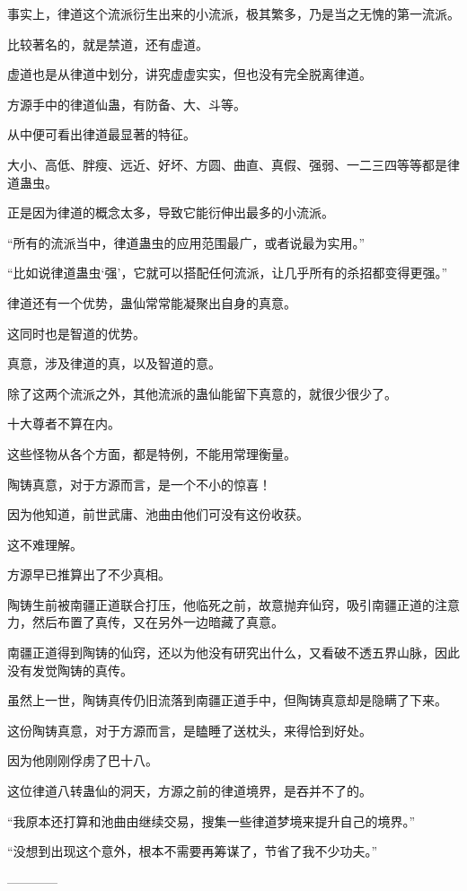 \begin{this_body}
事实上，律道这个流派衍生出来的小流派，极其繁多，乃是当之无愧的第一流派。

比较著名的，就是禁道，还有虚道。

虚道也是从律道中划分，讲究虚虚实实，但也没有完全脱离律道。

方源手中的律道仙蛊，有防备、大、斗等。

从中便可看出律道最显著的特征。

大小、高低、胖瘦、远近、好坏、方圆、曲直、真假、强弱、一二三四等等都是律道蛊虫。

正是因为律道的概念太多，导致它能衍伸出最多的小流派。

“所有的流派当中，律道蛊虫的应用范围最广，或者说最为实用。”

“比如说律道蛊虫‘强’，它就可以搭配任何流派，让几乎所有的杀招都变得更强。”

律道还有一个优势，蛊仙常常能凝聚出自身的真意。

这同时也是智道的优势。

真意，涉及律道的真，以及智道的意。

除了这两个流派之外，其他流派的蛊仙能留下真意的，就很少很少了。

十大尊者不算在内。

这些怪物从各个方面，都是特例，不能用常理衡量。

陶铸真意，对于方源而言，是一个不小的惊喜！

因为他知道，前世武庸、池曲由他们可没有这份收获。

这不难理解。

方源早已推算出了不少真相。

陶铸生前被南疆正道联合打压，他临死之前，故意抛弃仙窍，吸引南疆正道的注意力，然后布置了真传，又在另外一边暗藏了真意。

南疆正道得到陶铸的仙窍，还以为他没有研究出什么，又看破不透五界山脉，因此没有发觉陶铸的真传。

虽然上一世，陶铸真传仍旧流落到南疆正道手中，但陶铸真意却是隐瞒了下来。

这份陶铸真意，对于方源而言，是瞌睡了送枕头，来得恰到好处。

因为他刚刚俘虏了巴十八。

这位律道八转蛊仙的洞天，方源之前的律道境界，是吞并不了的。

“我原本还打算和池曲由继续交易，搜集一些律道梦境来提升自己的境界。”

“没想到出现这个意外，根本不需要再筹谋了，节省了我不少功夫。”

------------

\end{this_body}

